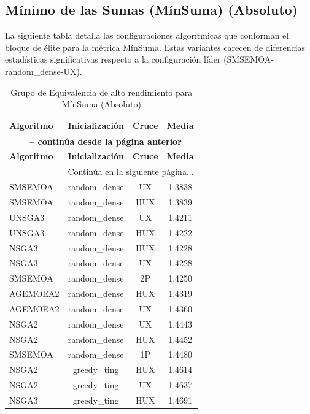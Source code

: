 \subsection{Mínimo de las Sumas (MínSuma) (Absoluto)}\label{anexo:elite_minsum}

La siguiente tabla detalla las configuraciones algorítmicas que conforman el bloque de élite para la métrica MínSuma. Estas variantes carecen de diferencias estadísticas significativas respecto a la configuración líder (SMSEMOA-random\_dense-UX).

\begin{longtable}{lccc}
    \caption{Grupo de Equivalencia de alto rendimiento para MínSuma (Absoluto)}
    \label{tab:elite_minsum} \\
    \toprule
    \textbf{Algoritmo} & \textbf{Inicialización} & \textbf{Cruce} & \textbf{Media} \\
    \midrule
    \endfirsthead
    \multicolumn{4}{c}{{\bfseries \tablename\ \thetable{} -- continúa desde la página anterior}} \\
    \toprule
    \textbf{Algoritmo} & \textbf{Inicialización} & \textbf{Cruce} & \textbf{Media} \\
    \midrule
    \endhead
    \midrule \multicolumn{4}{r}{{Continúa en la siguiente página...}} \\
    \endfoot
    \bottomrule
    \endlastfoot
    SMSEMOA & random\_dense & UX & 1.3838 \\
SMSEMOA & random\_dense & HUX & 1.3839 \\
UNSGA3 & random\_dense & UX & 1.4211 \\
UNSGA3 & random\_dense & HUX & 1.4222 \\
NSGA3 & random\_dense & HUX & 1.4228 \\
NSGA3 & random\_dense & UX & 1.4228 \\
SMSEMOA & random\_dense & 2P & 1.4250 \\
AGEMOEA2 & random\_dense & HUX & 1.4319 \\
AGEMOEA2 & random\_dense & UX & 1.4360 \\
NSGA2 & random\_dense & UX & 1.4443 \\
NSGA2 & random\_dense & HUX & 1.4452 \\
SMSEMOA & random\_dense & 1P & 1.4480 \\
NSGA2 & greedy\_ting & HUX & 1.4614 \\
NSGA2 & greedy\_ting & UX & 1.4637 \\
NSGA3 & greedy\_ting & HUX & 1.4691 \\

\end{longtable}
